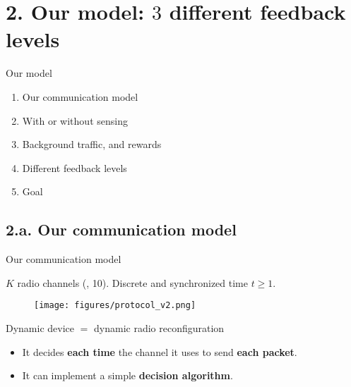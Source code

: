 
\section{\hfill{}2. Our model: $3$ different feedback levels\hfill{}}

\begin{frame}{Our model}

\begin{enumerate}
\def\labelenumi{\arabic{enumi}.}
\tightlist
\item Our communication model
\item With or without sensing
\item Background traffic, and rewards
\item Different feedback levels
\item Goal
\end{enumerate}

\end{frame}

\subsection{\hfill{}2.a. Our communication model\hfill{}}

\begin{frame}{Our communication model}

\(K\) radio channels (\eg, 10).
Discrete and synchronized time \(t\geq1\).

\begin{figure}[h!]
\centering
\texttt{[image: figures/protocol\_v2.png]}
\end{figure}

\pause

\begin{block}{Dynamic device \(=\) dynamic radio reconfiguration}

\begin{itemize}\tightlist
\item
  It decides \textbf{each time} the channel it uses to send \textbf{each
  packet}.
\item
  It can implement a simple \textbf{decision algorithm}.
\end{itemize}

\end{block}

\end{frame}



